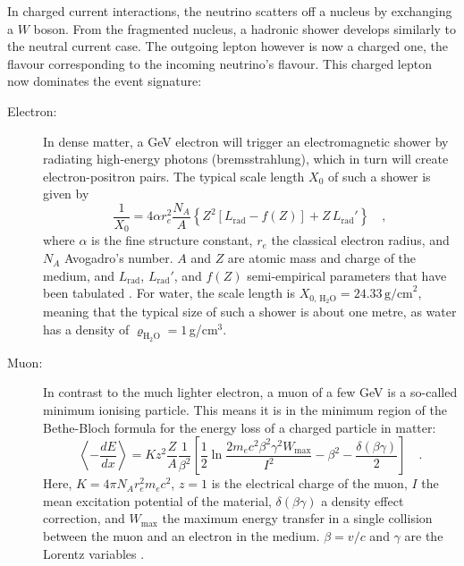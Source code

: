 In charged current interactions, the neutrino scatters off a nucleus by
exchanging a $W$ boson. From the fragmented nucleus, a hadronic shower develops
similarly to the neutral current case. The outgoing lepton however is now a
charged one, the flavour corresponding to the incoming neutrino's flavour. This
charged lepton now dominates the event signature:

\begin{description}
 \item[Electron:] In dense matter, a GeV electron will trigger an
  electromagnetic shower by radiating high-energy photons (bremsstrahlung),
  which in turn will create electron-positron pairs. The typical scale length
  $X_0$ of such a shower is given by
  \begin{equation}
   \frac{1}{X_0} = 4\alpha r_e^2 \frac{N_A}{A}
                    \left\{ Z^2 \left[L_\mathrm{rad} - f(Z) \right]
                    + Z\,L_\mathrm{rad}'\right\} \quad,
   \label{eqn:rad_length}
  \end{equation}
  where $\alpha$ is the fine structure constant, $r_e$ the classical electron
  radius, and $N_A$ Avogadro's number. $A$ and $Z$ are atomic mass and charge
  of the medium, and $L_\mathrm{rad}$, $L_\mathrm{rad}'$, and $f(Z)$
  semi-empirical parameters that have been tabulated \cite{PDG, bremsstrahlung}.
  For water, the scale length is $X_\mathrm{0,\,H_2O} =
  24.33\,\mathrm{g/cm}^2$, meaning that the typical size of such a shower is
  about one metre, as water has a density of $\varrho_\mathrm{H_2O} =
  1$\,g/cm$^3$.
 \item[Muon:] In contrast to the much lighter electron, a muon of a few GeV is
  a so-called minimum ionising particle. This means it is in the minimum region
  of the Bethe-Bloch formula for the energy loss of a charged particle in
  matter:
  \begin{equation}
   \left\langle -\frac{dE}{dx}\right\rangle = Kz^2\frac{Z}{A}\frac{1}{\beta^2}
      \left[ \frac{1}{2}\ln\frac{2m_ec^2\beta^2\gamma^2 W_\mathrm{max}}{I^2}
             - \beta^2 - \frac{\delta(\beta\gamma)}{2} \right] \quad.
   \label{eqn:bethe-bloch}
  \end{equation}
  Here, $K = 4\pi N_A r_e^2 m_ec^2$, $z=1$ is the electrical charge of the
  muon, $I$ the mean excitation potential of the material, $\delta(\beta\gamma)$
  a density effect correction, and $W_\mathrm{max}$  the maximum energy transfer
  in a single collision between the muon and an  electron in the medium.
  $\beta = v/c$ and $\gamma$ are the Lorentz variables \cite{PDG}.


\end{description}
